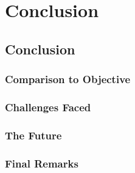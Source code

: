 \chapter{Conclusion}
\section{Conclusion}

\subsection{Comparison to Objective}

\subsection{Challenges Faced}

\subsection{The Future}

\subsection{Final Remarks}
